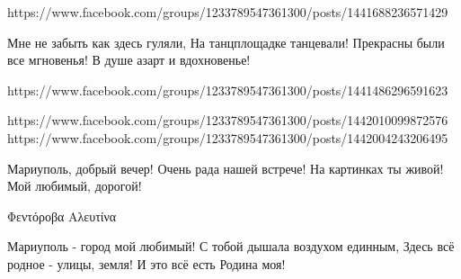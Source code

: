  
 
 
 
 

https://www.facebook.com/groups/1233789547361300/posts/1441688236571429

Мне не забыть как здесь гуляли,
На танцплощадке танцевали!
Прекрасны были все мгновенья!
В душе азарт и вдохновенье!

https://www.facebook.com/groups/1233789547361300/posts/1441486296591623

https://www.facebook.com/groups/1233789547361300/posts/1442010099872576
https://www.facebook.com/groups/1233789547361300/posts/1442004243206495

Мариуполь, добрый вечер!
Очень рада нашей встрече!
На картинках ты живой!
Мой любимый, дорогой!

Φεντόροβα Αλευτίνα

Мариуполь - город мой любимый!
С тобой дышала воздухом единным,
Здесь всё родное - улицы, земля!
И это всё есть Родина моя!
